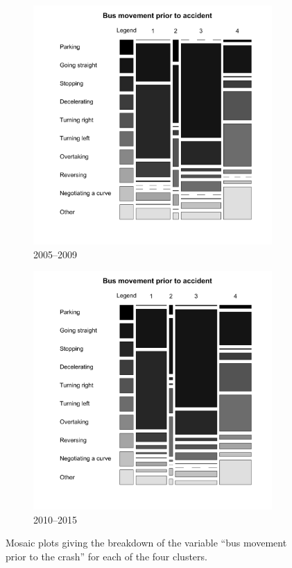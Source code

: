 \begin{figure}[t]
        \begin{subfigure}{.5\textwidth}
                \includegraphics[width=1\linewidth]{bus_mov_0509.png}
                \caption{2005--2009}
        \end{subfigure}%
        \begin{subfigure}{.5\textwidth}
                \includegraphics[width=1\linewidth]{bus_mov.png}
                \caption{2010--2015}
        \end{subfigure}
        \caption{Mosaic plots giving the breakdown of the variable ``bus movement prior to the crash'' for each of the four clusters.}
        \label{fig:clus4}
\end{figure} 

